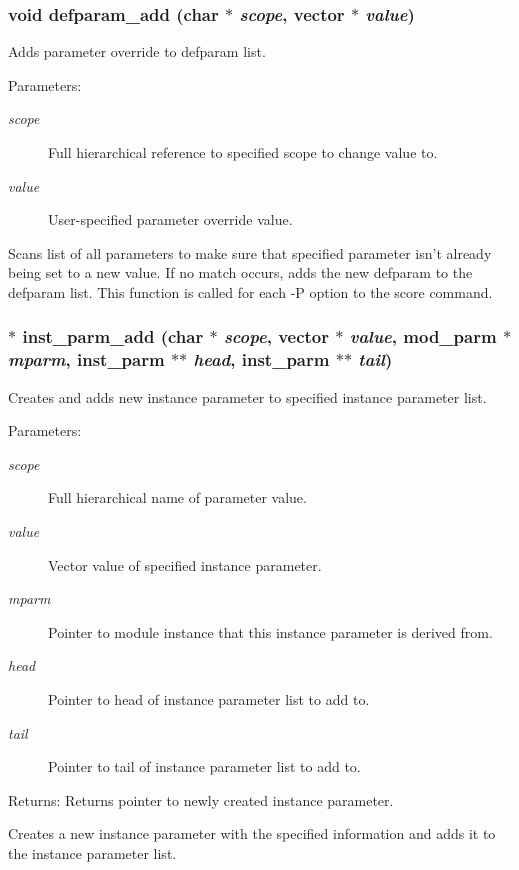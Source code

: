\subsubsection{\setlength{\rightskip}{0pt plus 5cm}void defparam\_\-add (char $\ast$ {\em scope}, {\bf vector} $\ast$ {\em value})}\label{param_8h_a6}


Adds parameter override to defparam list.

\begin{Desc}
\item[Parameters:]
\begin{description}
\item[{\em scope}]Full hierarchical reference to specified scope to change value to. \item[{\em value}]User-specified parameter override value.\end{description}
\end{Desc}
Scans list of all parameters to make sure that specified parameter isn't already being set to a new value. If no match occurs, adds the new defparam to the defparam list. This function is called for each -P option to the score command. 
\subsubsection{$\ast$ inst\_\-parm\_\-add (char $\ast$ {\em scope}, {\bf vector} $\ast$ {\em value}, {\bf mod\_\-parm} $\ast$ {\em mparm}, {\bf inst\_\-parm} $\ast$$\ast$ {\em head}, {\bf inst\_\-parm} $\ast$$\ast$ {\em tail})}\label{param_8h_a5}


Creates and adds new instance parameter to specified instance parameter list.

\begin{Desc}
\item[Parameters:]
\begin{description}
\item[{\em scope}]Full hierarchical name of parameter value. \item[{\em value}]Vector value of specified instance parameter. \item[{\em mparm}]Pointer to module instance that this instance parameter is derived from. \item[{\em head}]Pointer to head of instance parameter list to add to. \item[{\em tail}]Pointer to tail of instance parameter list to add to.\end{description}
\end{Desc}
\begin{Desc}
\item[Returns:]Returns pointer to newly created instance parameter.\end{Desc}
Creates a new instance parameter with the specified information and adds it to the instance parameter list. 
